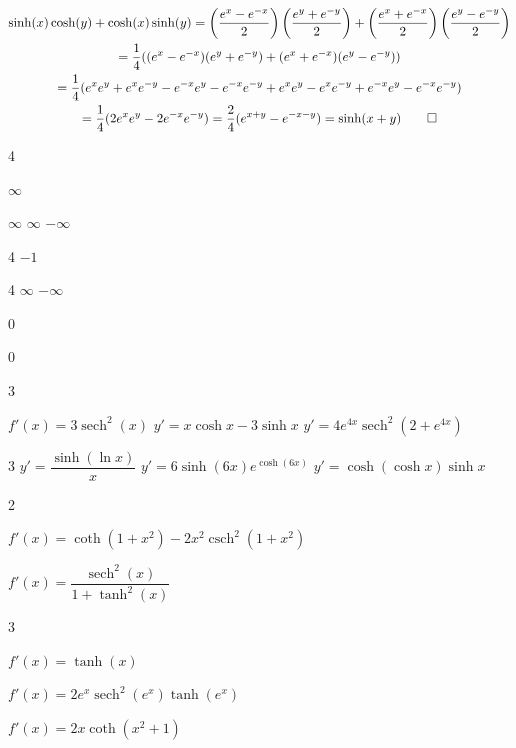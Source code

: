 \documentclass{book}
\DeclareMathOperator{\sech}{sech}
\DeclareMathOperator{\csch}{csch}
\begin{document}
\begin{appendices}
\begin{enumerate}[!HW!]
\itemspade \begin{pf}\mbox{}\vspace{-35pt}

\begin{multline*}
\sinh(x)\cosh(y)+\cosh(x)\sinh(y) = \left(\dfrac{e^x-e^{-x}}{2}\right)\left(\dfrac{e^y+e^{-y}}{2}\right)+ \left(\dfrac{e^x+e^{-x}}{2}\right)\left(\dfrac{e^y-e^{-y}}{2}\right)\\
 = \dfrac{1}{4}((e^x-e^{-x})(e^y+e^{-y}) + (e^x+e^{-x})(e^y-e^{-y}))\\ = \dfrac{1}{4}(e^xe^y + e^xe^{-y} - e^{-x}e^y - e^{-x}e^{-y} + e^xe^y - e^xe^{-y} + e^{-x}e^y - e^{-x}e^{-y})\\
  = \dfrac{1}{4}(2e^xe^y   - 2e^{-x}e^{-y} ) = \dfrac{2}{4}(e^{x+y}- e^{-x-y}) = \sinh(x+y) \qedhere
\end{multline*}
\end{pf}

\begin{multicols}{4}
\item $\infty$
\item $\infty$
\itemspade $\infty$
\itemspade $-\infty$
\end{multicols}
\begin{multicols}{4}
\itemspade $-1$
\end{multicols}
\begin{multicols}{4}
\itemspade $\infty$
\itemspade $-\infty$
\item 0
\item 0
\end{multicols}

\begin{multicols}{3}
\item $f'(x)=3\sech^2(x)$
\itemspade $y'=x\cosh x - 3\sinh x$
\itemspade $y'=4e^{4x}\sech^2(2+e^{4x})$
\end{multicols}
\begin{multicols}{3}
\itemspade $y'=\dfrac{\sinh(\ln x)}{x}$
\itemspade $y' =6\sinh(6x)e^{\cosh(6x)}$
\itemspade $y'=\cosh(\cosh x)\sinh x$
\end{multicols}
\begin{multicols}{2}
\item $f'(x)=\coth(1+x^2)- 2x^2\csch^2(1+x^2)$
\item $f'(x)=\dfrac{\sech^2(x)}{1+\tanh^2(x)}$
\end{multicols}
\begin{multicols}{3}
\item $f'(x)=\tanh(x)$
\item $f'(x)=2e^x\sech^2(e^x)\tanh(e^x)$
\item $f'(x)=2x\coth(x^2+1)$
\end{multicols}


\end{enumerate}
\end{appendices}
\end{document}
